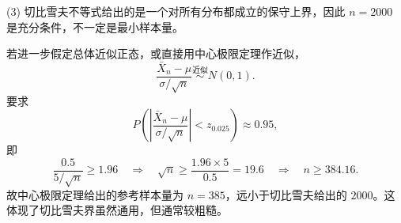 (3) 切比雪夫不等式给出的是一个对所有分布都成立的保守上界，因此 $n=2000$ 是充分条件，不一定是最小样本量。

若进一步假定总体近似正态，或直接用中心极限定理作近似，
\[
\frac{\bar X_n-\mu}{\sigma/\sqrt n}\overset{\text{近似}}{\sim}N(0,1).
\]
要求
\[
P\left(\left|\frac{\bar X_n-\mu}{\sigma/\sqrt n}\right|
<z_{0.025}\right)\approx0.95,
\]
即
\[
\frac{0.5}{5/\sqrt n}\geq1.96
\quad\Longrightarrow\quad
\sqrt n\geq\frac{1.96\times5}{0.5}=19.6
\quad\Longrightarrow\quad
n\geq384.16.
\]
故中心极限定理给出的参考样本量为 $n=385$，远小于切比雪夫给出的 $2000$。这体现了切比雪夫界虽然通用，但通常较粗糙。


\else \answerarea[10] \fi%
